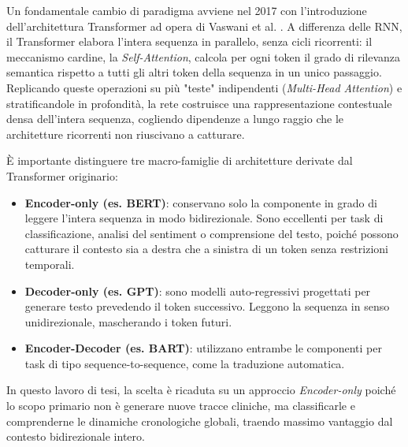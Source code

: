 Un fondamentale cambio di paradigma avviene nel 2017 con l'introduzione dell'architettura Transformer ad opera di Vaswani et al. \cite{vaswani2017attention}. A differenza delle RNN, il Transformer elabora l'intera sequenza in parallelo, senza cicli ricorrenti: il meccanismo cardine, la \textit{Self-Attention}, calcola per ogni token il grado di rilevanza semantica rispetto a tutti gli altri token della sequenza in un unico passaggio. Replicando queste operazioni su più "teste" indipendenti (\textit{Multi-Head Attention}) e stratificandole in profondità, la rete costruisce una rappresentazione contestuale densa dell'intera sequenza, cogliendo dipendenze a lungo raggio che le architetture ricorrenti non riuscivano a catturare.

È importante distinguere tre macro-famiglie di architetture derivate dal Transformer originario:
\begin{itemize}
    \item \textbf{Encoder-only (es. BERT)}: conservano solo la componente in grado di leggere l'intera sequenza in modo bidirezionale. Sono eccellenti per task di classificazione, analisi del sentiment o comprensione del testo, poiché possono catturare il contesto sia a destra che a sinistra di un token senza restrizioni temporali.
    \item \textbf{Decoder-only (es. GPT)}: sono modelli auto-regressivi progettati per generare testo prevedendo il token successivo. Leggono la sequenza in senso unidirezionale, mascherando i token futuri.
    \item \textbf{Encoder-Decoder (es. BART)}: utilizzano entrambe le componenti per task di tipo sequence-to-sequence, come la traduzione automatica.
\end{itemize}

In questo lavoro di tesi, la scelta è ricaduta su un approccio \textit{Encoder-only} poiché lo scopo primario non è generare nuove tracce cliniche, ma classificarle e comprenderne le dinamiche cronologiche globali, traendo massimo vantaggio dal contesto bidirezionale intero.

